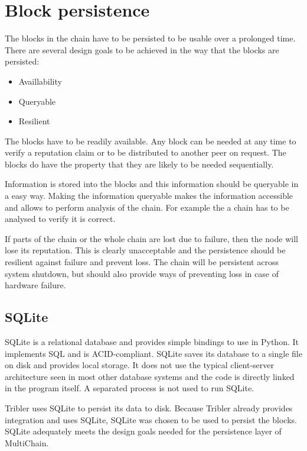 \section{Block persistence}
The blocks in the chain have to be persisted to be usable over a prolonged time.
There are several design goals to be achieved in the way that the blocks are persisted:
\begin{itemize}
    \item Availlability
    \item Queryable
    \item Resilient
\end{itemize}

The blocks have to be readily available.
Any block can be needed at any time to verify a reputation claim
or to be distributed to another peer on request.
The blocks do have the property that they are likely to be needed sequentially.

Information is stored into the blocks and this information should be queryable in a easy way.
Making the information queryable makes the information accessible
and allows to perform analysis of the chain.
For example the a chain has to be analysed to verify it is correct.

If parts of the chain or the whole chain are lost due to failure,
then the node will lose its reputation.
This is clearly unacceptable and the persistence should be resilient against failure
and prevent loss.
The chain will be persistent across system shutdown,
but should also provide ways of preventing loss in case of hardware failure.

\subsection{SQLite}
SQLite is a relational database and provides simple bindings to use in Python\cite{owens-sqlite}.
It implements SQL and is ACID-compliant\cite{haerder-ACID}.
SQLite saves its database to a single file on disk and provides local storage.
It does not use the typical client-server architecture seen in most other database systems
and the code is directly linked in the program itself.
A separated process is not used to run SQLite.

Tribler uses SQLite to persist its data to disk.
Because Tribler already provides integration and uses SQLite,
SQLite was chosen to be used to persist the blocks.
SQLite adequately meets the design goals needed for the persistence layer of MultiChain.

